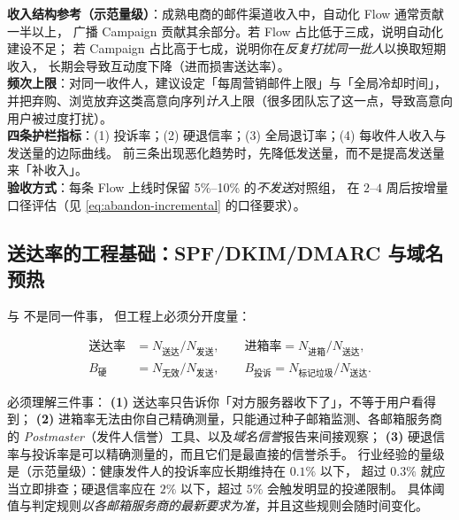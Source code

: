 \begin{toolbox}
\textbf{收入结构参考（示范量级）}：成熟电商的邮件渠道收入中，自动化 Flow 通常贡献一半以上，
广播 Campaign 贡献其余部分。若 Flow 占比低于三成，说明自动化建设不足；
若 Campaign 占比高于七成，说明你在\emph{反复打扰同一批人}以换取短期收入，
长期会导致互动度下降（进而损害送达率）。\\
\textbf{频次上限}：对同一收件人，建议设定「每周营销邮件上限」与「全局冷却时间」，
并把弃购、浏览放弃这类高意向序列\emph{计入}上限（很多团队忘了这一点，导致高意向用户被过度打扰）。\\
\textbf{四条护栏指标}：(1) 投诉率；(2) 硬退信率；(3) 全局退订率；(4) 每收件人收入与发送量的边际曲线。
前三条出现恶化趋势时，先降低发送量，而不是提高发送量来「补收入」。\\
\textbf{验收方式}：每条 Flow 上线时保留 5\%--10\% 的\emph{不发送}对照组，
在 $2$--$4$ 周后按增量口径评估（见 \cref{eq:abandon-incremental} 的口径要求）。
\end{toolbox}

\subsection{送达率的工程基础：SPF/DKIM/DMARC 与域名预热}

 与 不是同一件事，
但工程上必须分开度量：

\begin{equation}
\begin{aligned}
\text{送达率} &= N_{\text{送达}} / N_{\text{发送}}, \qquad
\text{进箱率} = N_{\text{进箱}} / N_{\text{送达}}, \\[2pt]
B_{\text{硬}} &= N_{\text{无效}} / N_{\text{发送}}, \qquad
B_{\text{投诉}} = N_{\text{标记垃圾}} / N_{\text{送达}} .
\end{aligned}
\label{eq:deliverability}
\end{equation}

必须理解三件事：
\textbf{(1)} 送达率只告诉你「对方服务器收下了」，不等于用户看得到；
\textbf{(2)} 进箱率无法由你自己精确测量，只能通过种子邮箱监测、各邮箱服务商的
\emph{Postmaster}（发件人信誉）工具、以及\emph{域名信誉}报告来间接观察；
\textbf{(3)} 硬退信率与投诉率是可以精确测量的，而且它们是最直接的信誉杀手。
行业经验的量级是（示范量级）：健康发件人的投诉率应长期维持在 $0.1\%$ 以下，
超过 $0.3\%$ 就应当立即排查；硬退信率应在 $2\%$ 以下，超过 $5\%$ 会触发明显的投递限制。
具体阈值与判定规则\emph{以各邮箱服务商的最新要求为准}，并且这些规则会随时间变化。

